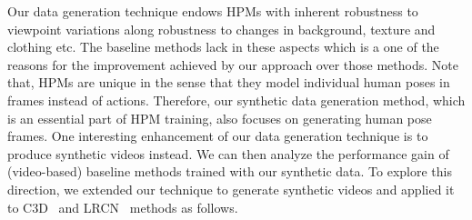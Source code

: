 \documentclass[twocolumn]{svjour3}          \smartqed  \usepackage{graphicx}
\begin{document}
Our data generation technique endows HPMs with inherent robustness to viewpoint variations along robustness to changes in  background, texture and clothing etc. The  baseline methods lack in these aspects which is a one of the reasons for the improvement achieved by our approach over those methods.  Note that, HPMs are unique in the sense that they model individual human poses in frames instead of actions. Therefore, our synthetic data generation method, which is an essential part of HPM training,  also focuses on generating human pose frames. One interesting enhancement of our data generation technique is to produce  synthetic videos instead. We can then  analyze the performance gain of (video-based) baseline methods  trained with our synthetic data. To explore this direction, we extended our technique to generate  synthetic videos and applied it to  C3D~\citep{tran2015learning} and LRCN~\citep{LRCN} methods as follows.
\end{document}
